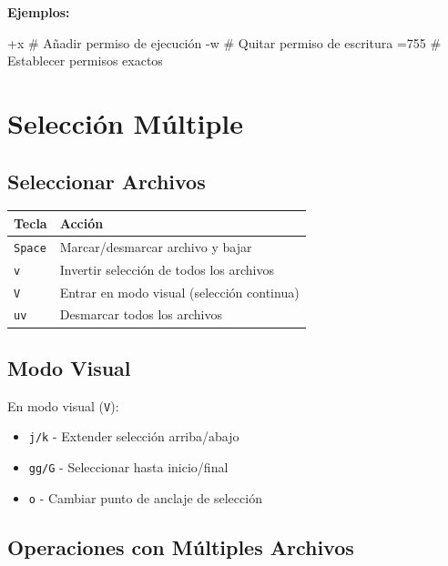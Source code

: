 \documentclass[
  doc,
  floatsintext,
  longtable,
  a4paper,
  nolmodern,
  notxfonts,
  notimes,
  12pt,
  colorlinks=true,linkcolor=blue,citecolor=blue,urlcolor=blue]{apa7}
\newenvironment{Shaded}{\begin{snugshade}}{\end{snugshade}}
\newcommand{\CommentTok}[1]{\textcolor[rgb]{0.37,0.37,0.37}{#1}}
\newcommand{\ExtensionTok}[1]{\textcolor[rgb]{0.00,0.23,0.31}{#1}}
\providecommand{\tightlist}{%
  \setlength{\itemsep}{0pt}\setlength{\parskip}{0pt}}
\newcounter{none} %
\begin{document}
\textbf{Ejemplos:}

\begin{Shaded}
\begin{Highlighting}[]
\ExtensionTok{+x}    \CommentTok{\# Añadir permiso de ejecución}
\ExtensionTok{{-}w}    \CommentTok{\# Quitar permiso de escritura}
\ExtensionTok{=755}  \CommentTok{\# Establecer permisos exactos}
\end{Highlighting}
\end{Shaded}

\section{Selección Múltiple}\label{selecciuxf3n-muxfaltiple}

\subsection{Seleccionar Archivos}\label{seleccionar-archivos}

{\def\LTcaptype{none} %
\begin{longtable}[]{@{}ll@{}}
\toprule\noalign{}
Tecla & Acción \\
\midrule\noalign{}
\endhead
\bottomrule\noalign{}
\endlastfoot
\texttt{Space} & Marcar/desmarcar archivo y bajar \\
\texttt{v} & Invertir selección de todos los archivos \\
\texttt{V} & Entrar en modo visual (selección continua) \\
\texttt{uv} & Desmarcar todos los archivos \\
\end{longtable}
}

\subsection{Modo Visual}\label{modo-visual}

En modo visual (\texttt{V}):

\begin{itemize}
\tightlist
\item
  \texttt{j/k} - Extender selección arriba/abajo
\item
  \texttt{gg/G} - Seleccionar hasta inicio/final
\item
  \texttt{o} - Cambiar punto de anclaje de selección
\end{itemize}

\subsection{Operaciones con Múltiples
Archivos}\label{operaciones-con-muxfaltiples-archivos}
\end{document}
